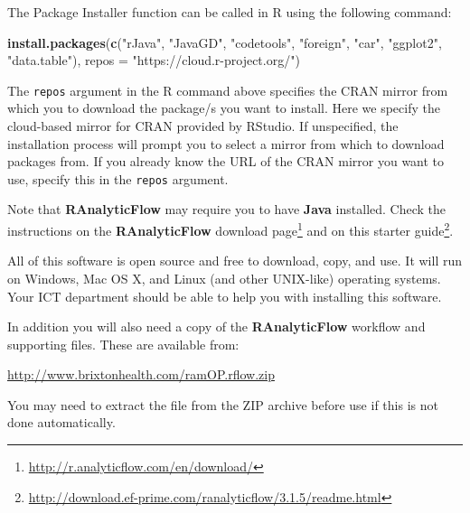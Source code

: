 \documentclass[12pt,a4paper]{book}
\newenvironment{Shaded}{\begin{snugshade}}{\end{snugshade}}
\newcommand{\DataTypeTok}[1]{\textcolor[rgb]{0.13,0.29,0.53}{#1}}
\newcommand{\KeywordTok}[1]{\textcolor[rgb]{0.13,0.29,0.53}{\textbf{#1}}}
\newcommand{\NormalTok}[1]{#1}
\newcommand{\StringTok}[1]{\textcolor[rgb]{0.31,0.60,0.02}{#1}}
\let\rmarkdownfootnote\footnote%
\def\footnote{\protect\rmarkdownfootnote}
\renewcommand{\href}[2]{#2\footnote{\url{#1}}}
\begin{document}
The Package Installer function can be called in R using the following command:

\begin{Shaded}
\begin{Highlighting}[]
\KeywordTok{install.packages}\NormalTok{(}\KeywordTok{c}\NormalTok{(}\StringTok{"rJava"}\NormalTok{, }\StringTok{"JavaGD"}\NormalTok{, }\StringTok{"codetools"}\NormalTok{, }
                   \StringTok{"foreign"}\NormalTok{, }\StringTok{"car"}\NormalTok{, }\StringTok{"ggplot2"}\NormalTok{, }\StringTok{"data.table"}\NormalTok{), }
                   \DataTypeTok{repos =} \StringTok{"https://cloud.r-project.org/"}\NormalTok{)}
\end{Highlighting}
\end{Shaded}

The \texttt{repos} argument in the R command above specifies the CRAN mirror from which you to download the package/s you want to install. Here we specify the cloud-based mirror for CRAN provided by RStudio. If unspecified, the installation process will prompt you to select a mirror from which to download packages from. If you already know the URL of the CRAN mirror you want to use, specify this in the \texttt{repos} argument.

Note that \textbf{RAnalyticFlow} may require you to have \textbf{Java} installed. Check the instructions on the \textbf{RAnalyticFlow} \href{http://r.analyticflow.com/en/download/}{download page} and on this \href{http://download.ef-prime.com/ranalyticflow/3.1.5/readme.html}{starter guide}.

All of this software is open source and free to download, copy, and use. It will run on Windows, Mac OS X, and Linux (and other UNIX-like) operating systems. Your ICT department should be able to help you with installing this software.

In addition you will also need a copy of the \textbf{RAnalyticFlow} workflow and supporting files. These are available from:

\url{http://www.brixtonhealth.com/ramOP.rflow.zip}

You may need to extract the file from the ZIP archive before use if this is not done automatically.
\end{document}
